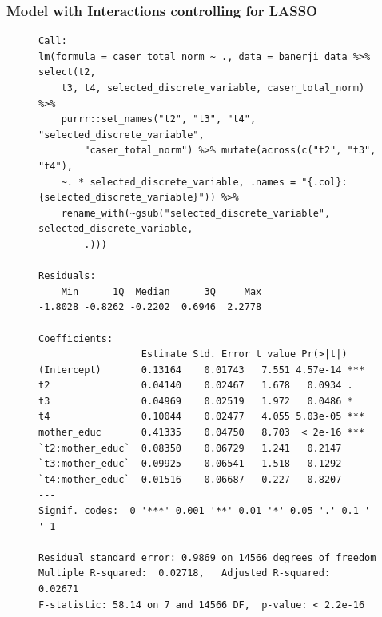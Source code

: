 \documentclass{article}
\begin{document}
\subsubsection*{Model with Interactions controlling for LASSO}
\begin{figure}[H]
\begin{lstlisting}[style=RstyleComment, caption=Model with Interactions controlling for LASSO]
Call:
lm(formula = caser_total_norm ~ ., data = banerji_data %>% select(t2, 
    t3, t4, selected_discrete_variable, caser_total_norm) %>% 
    purrr::set_names("t2", "t3", "t4", "selected_discrete_variable", 
        "caser_total_norm") %>% mutate(across(c("t2", "t3", "t4"), 
    ~. * selected_discrete_variable, .names = "{.col}:{selected_discrete_variable}")) %>% 
    rename_with(~gsub("selected_discrete_variable", selected_discrete_variable, 
        .)))

Residuals:
    Min      1Q  Median      3Q     Max 
-1.8028 -0.8262 -0.2202  0.6946  2.2778 

Coefficients:
                  Estimate Std. Error t value Pr(>|t|)    
(Intercept)       0.13164    0.01743   7.551 4.57e-14 ***
t2                0.04140    0.02467   1.678   0.0934 .  
t3                0.04969    0.02519   1.972   0.0486 *  
t4                0.10044    0.02477   4.055 5.03e-05 ***
mother_educ       0.41335    0.04750   8.703  < 2e-16 ***
`t2:mother_educ`  0.08350    0.06729   1.241   0.2147    
`t3:mother_educ`  0.09925    0.06541   1.518   0.1292    
`t4:mother_educ` -0.01516    0.06687  -0.227   0.8207    
---
Signif. codes:  0 '***' 0.001 '**' 0.01 '*' 0.05 '.' 0.1 ' ' 1

Residual standard error: 0.9869 on 14566 degrees of freedom
Multiple R-squared:  0.02718,	Adjusted R-squared:  0.02671 
F-statistic: 58.14 on 7 and 14566 DF,  p-value: < 2.2e-16
\end{lstlisting}
\end{figure}
\end{document}
